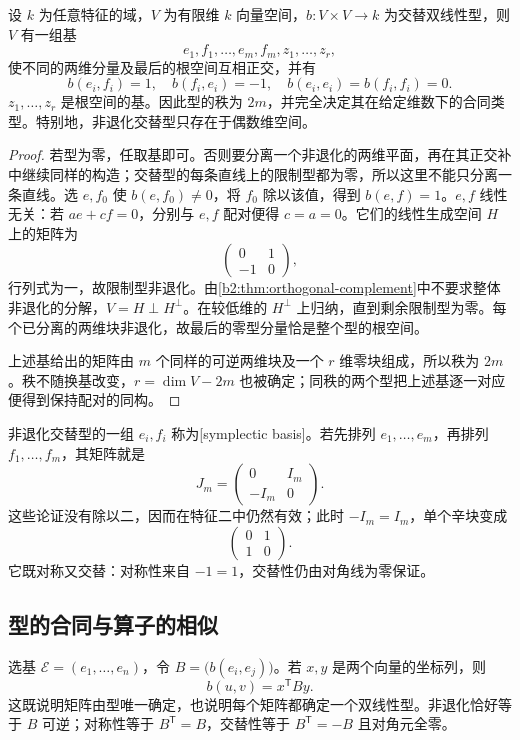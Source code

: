 \begin{theorem}[交替型的标准形]\label{b2:thm:alternating-form-normal}
	设 \(k\) 为任意特征的域，\(V\) 为有限维 \(k\) 向量空间，\(b:V\times V\to k\) 为交替双线性型，则 \(V\) 有一组基
	\[
		e_1,f_1,\ldots,e_m,f_m,z_1,\ldots,z_r,
	\]
	使不同的两维分量及最后的根空间互相正交，并有
	\[
		b(e_i,f_i)=1,\quad b(f_i,e_i)=-1,\quad b(e_i,e_i)=b(f_i,f_i)=0.
	\]
	\(z_1,\ldots,z_r\) 是根空间的基。因此型的秩为 \(2m\)，并完全决定其在给定维数下的合同类型。特别地，非退化交替型只存在于偶数维空间。
\end{theorem}
\begin{proof}
	若型为零，任取基即可。否则要分离一个非退化的两维平面，再在其正交补中继续同样的构造；交替型的每条直线上的限制型都为零，所以这里不能只分离一条直线。选 \(e,f_0\) 使 \(b(e,f_0)\ne0\)，将 \(f_0\) 除以该值，得到 \(b(e,f)=1\)。\(e,f\) 线性无关：若 \(ae+cf=0\)，分别与 \(e,f\) 配对便得 \(c=a=0\)。它们的线性生成空间 \(H\) 上的矩阵为
	\[
		\begin{pmatrix}0&1\\-1&0\end{pmatrix},
	\]
	行列式为一，故限制型非退化。由\cref{b2:thm:orthogonal-complement}中不要求整体非退化的分解，\(V=H\perp H^\perp\)。在较低维的 \(H^\perp\) 上归纳，直到剩余限制型为零。每个已分离的两维块非退化，故最后的零型分量恰是整个型的根空间。

	上述基给出的矩阵由 \(m\) 个同样的可逆两维块及一个 \(r\) 维零块组成，所以秩为 \(2m\)。秩不随换基改变，\(r=\dim V-2m\) 也被确定；同秩的两个型把上述基逐一对应便得到保持配对的同构。
\end{proof}

非退化交替型的一组 \(e_i,f_i\) 称为[symplectic basis]。若先排列 \(e_1,\ldots,e_m\)，再排列 \(f_1,\ldots,f_m\)，其矩阵就是
\[
	J_m=\begin{pmatrix}0&I_m\\-I_m&0\end{pmatrix}.
\]
这些论证没有除以二，因而在特征二中仍然有效；此时 \(-I_m=I_m\)，单个辛块变成
\[
	\begin{pmatrix}0&1\\1&0\end{pmatrix}.
\]
它既对称又交替：对称性来自 \(-1=1\)，交替性仍由对角线为零保证。

\subsection{型的合同与算子的相似}
\label{b2:subsec:1001:03}

选基 \(\mathcal E=(e_1,\ldots,e_n)\)，令 \(B=\bigl(b(e_i,e_j)\bigr)\)。若 \(x,y\) 是两个向量的坐标列，则
\[
	b(u,v)=x^{\mathsf T}By.
\]
这既说明矩阵由型唯一确定，也说明每个矩阵都确定一个双线性型。非退化恰好等于 \(B\) 可逆；对称性等于 \(B^{\mathsf T}=B\)，交替性等于 \(B^{\mathsf T}=-B\) 且对角元全零。

